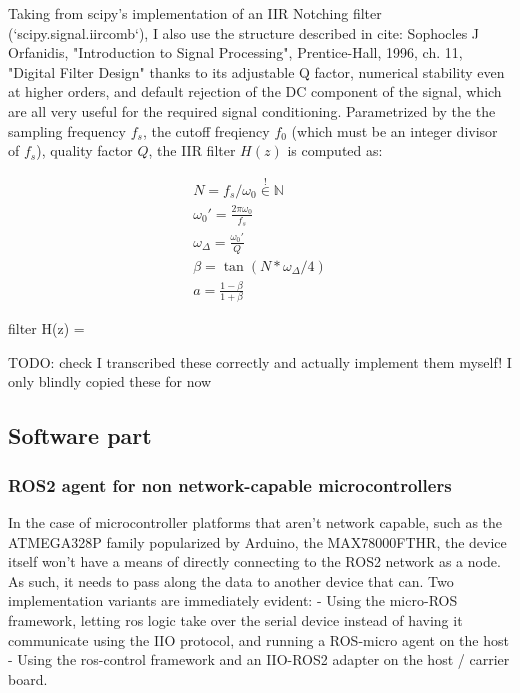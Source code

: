 \documentclass{thesis}
\newcommand{\todo}[1]{{\color{red}TODO: #1}}
\begin{document}
{Taking from scipy's implementation of an IIR Notching filter (`scipy.signal.iircomb`), I also use the structure described in {cite: Sophocles J Orfanidis, "Introduction to Signal Processing", Prentice-Hall, 1996, ch. 11, "Digital Filter Design"} thanks to its adjustable Q factor, numerical stability even at higher orders, and default rejection of the DC component of the signal, which are all very useful for the required signal conditioning. Parametrized by the the sampling frequency $f_s$, the cutoff freqiency $f_0$ (which must be an integer divisor of $f_s$), quality factor $Q$, the IIR filter $H(z)$ is computed as:

\begin{gather*}
N = f_s / \omega_0 \overset{!}{\in} \mathbb{N} \\
\omega_0' = \frac{2\pi\omega_0}{f_s}  \\
\omega_\Delta = \frac{\omega_0'}{Q}  \\
\beta = \tan(N * \omega_\Delta / 4)  \\
a = \frac{1 - \beta}{1 + \beta}
\end{gather*}
\begin{thesisequation}{filter}
H(z) =  \cdot {}
\end{thesisequation}

\todo{check I transcribed these correctly and actually implement them myself! I only blindly copied these for now}

\newpage
\subsection{Software part}

\subsubsection{ROS2 agent for non network-capable microcontrollers}

In the case of microcontroller platforms that aren't network capable, such as the ATMEGA328P family popularized by Arduino, the MAX78000FTHR, the device itself won't have a means of directly connecting to the ROS2 network as a node. As such, it needs to pass along the data to another device that can. Two implementation variants are immediately evident:
- Using the micro-ROS framework, letting ros logic take over the serial device instead of having it communicate using the IIO protocol, and running a ROS-micro agent on the host
- Using the ros-control framework and an IIO-ROS2 adapter on the host / carrier board.

}
\end{document}
